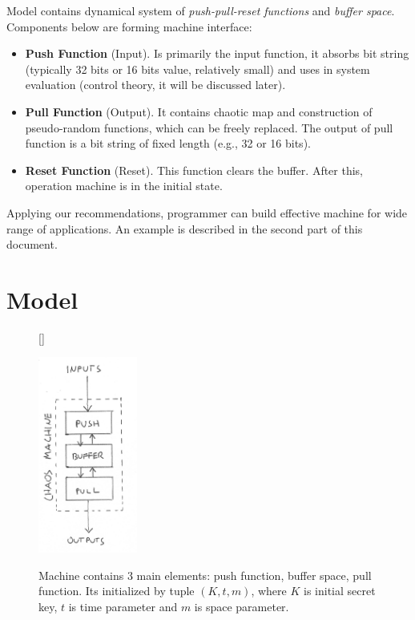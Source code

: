 \documentclass[twocolumn, a4paper, 10pt]{article}
\begin{document}
Model contains dynamical system of \textit{push-pull-reset functions} and \textit{buffer space}. Components below are forming machine interface:

\begin{itemize}

\item\textbf{Push Function} (Input). Is primarily the input function, it absorbs bit string (typically 32 bits or 16 bits value, relatively small) and uses in system evaluation (control theory, it will be discussed later).

\item\textbf{Pull Function} (Output). It contains chaotic map and construction of pseudo-random functions, which can be freely replaced. The output of pull function is a bit string of fixed length (e.g., 32 or 16 bits).

\item\textbf{Reset Function} (Reset). This function clears the buffer. After this, operation machine is in the initial state.

\end{itemize}

Applying our recommendations, programmer can build effective machine for wide range of applications. An example is described in the second part of this document.


\section{Model}

\begin{figure}[ht]
  \centering
  [\FBwidth]
  {\vspace*{-38.5pt}\caption{Machine contains 3 main elements: push function, buffer space, pull function. Its initialized by tuple $(K, t, m)$, where $K$ is initial secret key, $t$ is time parameter and $m$ is space parameter.}\label{fig:machine-diagram}}
  {\includegraphics[width=3.25cm]{machine-diagram}}
\end{figure}
\end{document}
